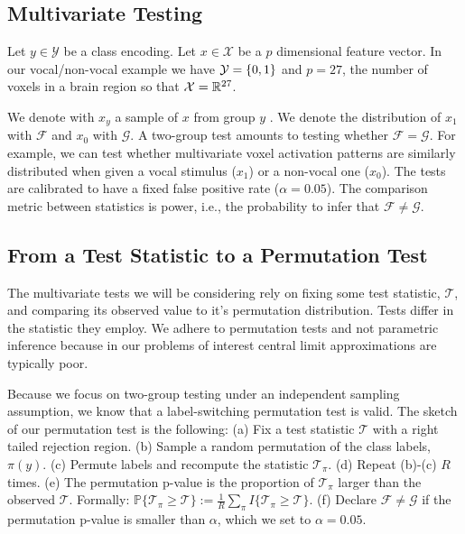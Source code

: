 \documentclass[]{bio}
\begin{document}
\subsection{Multivariate Testing}

Let $y \in \mathcal{Y}$ be a class encoding. 
Let $x \in \mathcal{X}$ be a $p$ dimensional feature vector. 
In our vocal/non-vocal example we have $\mathcal{Y}=\{ 0,1 \}$ and $p=27$, the number of voxels in a brain region so that $\mathcal{X}=\mathbb{R}^{27}$. 

We denote with $x_y$ a sample of $x$ from group $y$ .
We denote the distribution of $x_1$ with $\mathcal{F}$ and $x_0$ with $\mathcal{G}$.
A two-group test amounts to testing whether $\mathcal{F}=\mathcal{G}$.
For example, we can test whether multivariate voxel activation patterns are similarly distributed when given a vocal stimulus ($x_1$) or a non-vocal one ($x_0$).
The tests are calibrated to have a fixed false positive rate ($\alpha=0.05$).
The comparison metric between statistics is power, i.e., the probability to infer that $\mathcal{F}\neq\mathcal{G}$.


\subsection{From a Test Statistic to a Permutation Test}

The multivariate tests we will be considering rely on fixing some test statistic, $\mathcal{T}$, and comparing its observed value to it's permutation distribution. 
Tests differ in the statistic they employ.
We adhere to permutation tests and not parametric inference because in our problems of interest central limit approximations are typically poor.

Because we focus on two-group testing under an independent sampling assumption, we know that a label-switching permutation test is valid. 
The sketch of our permutation test is the following: \newline
(a) Fix a test statistic $\mathcal{T}$ with a right tailed rejection region. \newline
(b) Sample a random permutation of the class labels, $\pi(y)$. \newline
(c) Permute labels and recompute the statistic $\mathcal{T}_\pi$. \newline
(d) Repeat (b)-(c) $R$ times. \newline
(e) The permutation p-value is the proportion of  $\mathcal{T}_\pi$ larger than the observed $\mathcal{T}$. Formally: 
$\mathbb{P}\{\mathcal{T}_\pi \geq \mathcal{T}\}:=\frac{1}{R} \sum_{\pi} I\{\mathcal{T}_\pi \geq \mathcal{T}\}$.\newline
(f) Declare $\mathcal{F}\neq \mathcal{G}$ if the permutation p-value is smaller than $\alpha$, which we set to $\alpha=0.05$.
\bigskip
\end{document}
